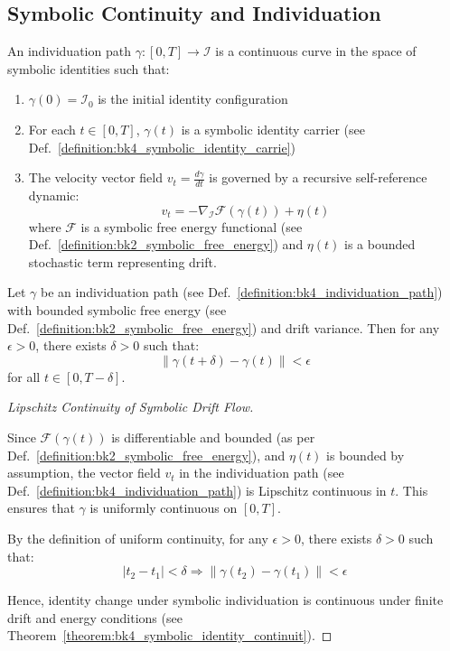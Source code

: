 \subsection{Symbolic Continuity and Individuation} \label{subsec:bk4_symbolic_continuity_individuation}
\begin{definition} \label{definition:bk4_individuation_path}
An individuation path $\gamma: [0, T] \to \mathcal{I}$ is a continuous curve in the space of symbolic identities such that:
\begin{enumerate}
    \item $\gamma(0) = \mathcal{I}_0$ is the initial identity configuration
    \item For each $t \in [0,T]$, $\gamma(t)$ is a symbolic identity carrier (see Def.~\ref{definition:bk4_symbolic_identity_carrie})
    \item The velocity vector field $v_t = \frac{d\gamma}{dt}$ is governed by a recursive self-reference dynamic:
    \begin{equation}
        v_t = -\nabla_{\mathcal{I}} \mathcal{F}(\gamma(t)) + \eta(t)
    \end{equation}
    where $\mathcal{F}$ is a symbolic free energy functional (see Def.~\ref{definition:bk2_symbolic_free_energy}) and $\eta(t)$ is a bounded stochastic term representing drift.
\end{enumerate}
\end{definition}
\begin{theorem} \label{theorem:bk4_symbolic_identity_continuit}
Let $\gamma$ be an individuation path (see Def.~\ref{definition:bk4_individuation_path}) with bounded symbolic free energy (see Def.~\ref{definition:bk2_symbolic_free_energy}) and drift variance. Then for any $\epsilon > 0$, there exists $\delta > 0$ such that:
\begin{equation}
    \|\gamma(t + \delta) - \gamma(t)\| < \epsilon
\end{equation}
for all $t \in [0, T - \delta]$.
\end{theorem}

\begin{proof}[Lipschitz Continuity of Symbolic Drift Flow]
\label{proof:bk4_lipschitz_continuity_symbolic_drift}
\leavevmode

Since $\mathcal{F}(\gamma(t))$ is differentiable and bounded 
(as per Def.~\ref{definition:bk2_symbolic_free_energy}), 
and $\eta(t)$ is bounded by assumption, 
the vector field $v_t$ in the individuation path 
(see Def.~\ref{definition:bk4_individuation_path}) 
is Lipschitz continuous in $t$. 
This ensures that $\gamma$ is uniformly continuous on $[0,T]$.

By the definition of uniform continuity, for any $\epsilon > 0$, there exists $\delta > 0$ such that:
\begin{equation}
    |t_2 - t_1| < \delta \Rightarrow \|\gamma(t_2) - \gamma(t_1)\| < \epsilon
\end{equation} 

Hence, identity change under symbolic individuation is continuous under finite drift and energy conditions (see Theorem~\ref{theorem:bk4_symbolic_identity_continuit}).
\end{proof}
